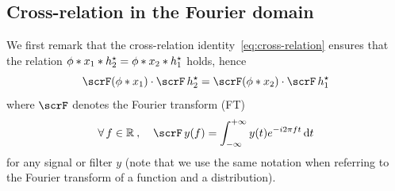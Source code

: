 \subsection{Cross-relation in the Fourier domain}

\newcommand{\paramVec}[1]{\Delta_{#1}}

We first remark that the cross-relation identity~\eqref{eq:cross-relation} ensures that the relation
$   \phi
    \ast x_1
    \ast  h_2^\star
    =
    \phi
    \ast x_2
    \ast  h_1^\star
$
holds, hence
\begin{equation}
    \label{eq:cross-relation-identity-fourier}
    \fourierTrans(\idealLowPassFilter\ast\contRecordedSignal_1) \cdot \fourierTrans \contFilter_2^\star
    =
    \fourierTrans(\idealLowPassFilter\ast\contRecordedSignal_2) \cdot \fourierTrans \contFilter_1^\star
\end{equation}
where $\fourierTrans$ denotes the Fourier transform (FT)
 \begin{equation}
     \kforall[f \in\kR]\quad \fourierTrans y(f) =
     \int_{-\infty}^{+\infty} y(t)\cste^{-\csti 2 \pi f t}\,\mathrm{d}t
 \end{equation}
 for any signal or filter $y$ (note that we use the same notation when referring to the Fourier transform of a function and a distribution).

